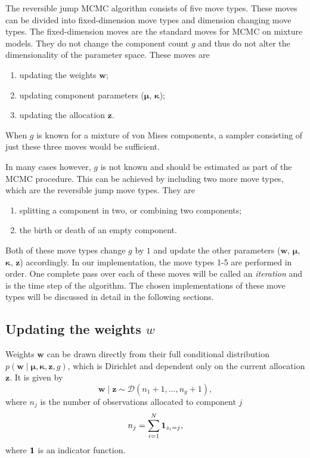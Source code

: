 The reversible jump MCMC algorithm consists of five move types. These moves can be divided into fixed-dimension move types and dimension changing move types. The fixed-dimension moves are the standard moves for MCMC on mixture models. They do not change the component count $g$ and thus do not alter the dimensionality of the parameter space. These moves are
\begin{enumerate}
	\item updating the weights $\bm w$;
	\item updating component parameters ($\bm \mu$, $\bm \kappa$);
	\item updating the allocation $\bm z$.
	\setcounter{enumTemp}{\theenumi}
\end{enumerate}
When $g$ is known for a mixture of von Mises components, a sampler consisting of just these three moves would be sufficient. 

In many cases however, $g$ is not known and should be estimated as part of the MCMC procedure. This can be achieved by including two more move types, which are the reversible jump move types. They are
\begin{enumerate}
	\setcounter{enumi}{\theenumTemp}
	\item splitting a component in two, or combining two components;
	\item the birth or death of an empty component.
\end{enumerate}
Both of these move types change $g$ by $1$ and update the other parameters ($\bm w$, $\bm \mu$, $\bm \kappa$, $\bm z$) accordingly. In our implementation, the move types 1-5 are performed in order. One complete pass over each of these moves will be called an \emph{iteration} and is the time step of the algorithm. The chosen implementations of these move types will be discussed in detail in the following sections.

\subsection{Updating the weights $w$}
Weights $\bm{w}$ can be drawn directly from their full conditional distribution $p(\bm{w}\mid\bm\mu,\bm\kappa,\bm{z}, g)$, which is Dirichlet and dependent only on the current allocation $\bm z$. It is given by
\begin{equation}
\bm{w}\mid\bm{z} \sim \mathcal{D}(n_1 + 1, ..., n_g + 1),
\end{equation}
where $n_j$ is the number of observations allocated to component $j$
\begin{equation}
n_j = \sum_{i=1}^N \mathbbm{1}_{z_i = j},
\end{equation}
where $\mathbbm{1}$ is an indicator function.

